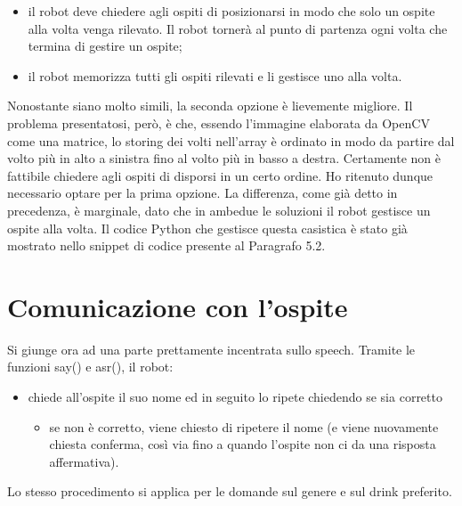 \documentclass[italian, twoside]{sapthesis} %
\begin{document}
    \begin{itemize}
	    \item il robot deve chiedere agli ospiti di posizionarsi in modo che solo un ospite alla volta venga rilevato. Il robot tornerà al punto di partenza ogni volta che termina di gestire un ospite;
	    \item il robot memorizza tutti gli ospiti rilevati e li gestisce uno alla volta.
    \end{itemize}
    
    
Nonostante siano molto simili, la seconda opzione è lievemente migliore. Il problema presentatosi, però, è che, essendo l'immagine elaborata da OpenCV come una matrice, lo storing dei volti nell'array è ordinato in modo da partire dal volto più in alto a sinistra fino al volto più in basso a destra. Certamente non è fattibile chiedere agli ospiti di disporsi in un certo ordine. Ho ritenuto dunque necessario optare per la prima opzione. La differenza, come già detto in precedenza, è marginale, dato che in ambedue le soluzioni il robot gestisce un ospite alla volta. Il codice Python che gestisce questa casistica è stato già mostrato nello snippet di codice presente al Paragrafo 5.2.

\section{Comunicazione con l'ospite}
Si giunge ora ad una parte prettamente incentrata sullo speech. Tramite le funzioni say() e asr(), il robot:

\begin{itemize}
    \item chiede all'ospite il suo nome ed in seguito lo ripete chiedendo se sia corretto
    \begin{itemize}
        \item se non è corretto, viene chiesto di ripetere il nome (e viene nuovamente chiesta conferma, così via fino a quando l'ospite non ci da una risposta affermativa).
    \end{itemize}
\end{itemize}
Lo stesso procedimento si applica per le domande sul genere e sul drink preferito.
\end{document}

